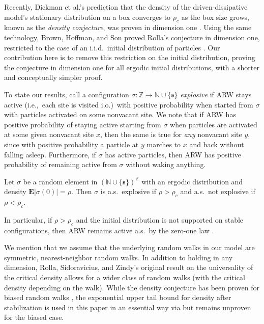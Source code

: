 \documentclass[ECP]{ejpecp} %
\begin{document}
Recently, Dickman et al.'s prediction that the density of the driven-dissipative
model's stationary distribution on a box converges to $\rho _{c}$ as the
box size grows, known as the \emph{density conjecture}, was proven in dimension
one \cite{HoffmanJohnsonJunge24}. Using the same technology, Brown, Hoffman,
and Son proved Rolla's conjecture in dimension one, restricted to the case
of an i.i.d.\ initial distribution of particles \cite{explosivity}. Our
contribution here is to remove this restriction on the initial distribution,
proving the conjecture in dimension one for all ergodic initial distributions,
with a shorter and conceptually simpler proof.

To state our results, call a configuration
$\sigma \colon \mathbb{Z}\to \mathbb{N}\cup \{\mathfrak{s}\}$
\emph{explosive} if ARW stays active (i.e.,\ each site is visited i.o.)\ with
positive probability when started from $\sigma $ with particles activated
on some nonvacant site. We note that if ARW has positive probability of
staying active starting from $\sigma $ when particles are activated at
some given nonvacant site $x$, then the same is true for \emph{any} nonvacant
site $y$, since with positive probability a particle at $y$ marches to
$x$ and back without falling asleep. Furthermore, if $\sigma $ has active
particles, then ARW has positive probability of remaining active from
$\sigma $ without waking anything.

\begin{theorem}%
\label{thm:explosive}
Let $\sigma $ be a random element in
$(\mathbb{N}\cup \{\mathfrak{s}\})^{\mathbb{Z}}$ with an ergodic distribution
and density $\mathbf{E}\mathopen{\lvert }\sigma (0)\mathclose{\rvert } = \rho $. Then $\sigma $ is a.s.\ explosive
if $\rho > \rho _{c}$ and a.s.\ not explosive if $\rho < \rho _{c}$.
\end{theorem}

In particular, if $\rho >\rho _{c}$ and the initial distribution is not
supported on stable configurations, then ARW remains active a.s.\ by the
zero-one law \cite[Lemma~4]{rolla2012absorbing}.

We mention that we assume that the underlying random walks in our model
are symmetric, nearest-neighbor random walks. In addition to holding in
any dimension, Rolla, Sidoravicius, and Zindy's original result on the
universality of the critical density allows for a wider class of random
walks (with the critical density depending on the walk). While the density
conjecture has been proven for biased random walks
\cite{forienDensity}, the exponential upper tail bound for density after
stabilization
\cite[Proposition~7.1 and Theorem~8.4]{HoffmanJohnsonJunge24} is used in
this paper in an essential way via \cite[Proposition~4.1]{cutoff} but remains
unproven for the biased case.
\end{document}

